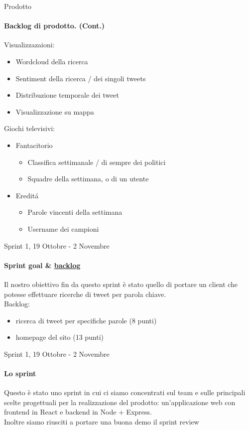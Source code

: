 \documentclass[12pt, aspectration=169]{beamer}
\begin{document}
\begin{frame}{Prodotto}
\framesubtitle{Backlog di prodotto. (Cont.)}
\begin{multicols}{2}
Visualizzazaioni:
\begin{itemize}
\item Wordcloud della ricerca
\item Sentiment della ricerca / dei singoli tweets
\item Distribuzione temporale dei tweet
\item Visualizzazione su mappa
\end{itemize}

\columnbreak
Giochi televisivi:
\begin{itemize}
\item Fantacitorio
\begin{itemize}
    \item Classifica settimanale / di sempre dei politici
    \item Squadre della settimana, o di un utente
\end{itemize}
\item Eredit\'a
\begin{itemize}
    \item Parole vincenti della settimana
    \item Username dei campioni
\end{itemize}
\end{itemize}
\end{multicols}
\end{frame}
\begin{frame}{Sprint 1, 19 Ottobre - 2 Novembre}
\framesubtitle{Sprint goal \& \href{https://taiga.hjkl.gq/project/ingsw2022-team3/taskboard/sprint-1-5}{backlog}}
Il nostro obiettivo fin da questo sprint è stato quello di portare un client che potesse effettuare ricerche di tweet per parola chiave. \\
Backlog:
\begin{itemize}
    \item ricerca di tweet per specifiche parole (8 punti)
    \item homepage del sito (13 punti)
\end{itemize}
\end{frame}
\begin{frame}{Sprint 1, 19 Ottobre - 2 Novembre}
\framesubtitle{Lo sprint}
Questo \`e stato uno sprint in cui ci siamo concentrati sul team e sulle principali scelte progettuali per la realizzazione del prodotto: un'applicazione web con frontend in React e backend in Node + Express. \\
Inoltre siamo riusciti a portare una buona demo il sprint review
\end{frame}
\end{document}
